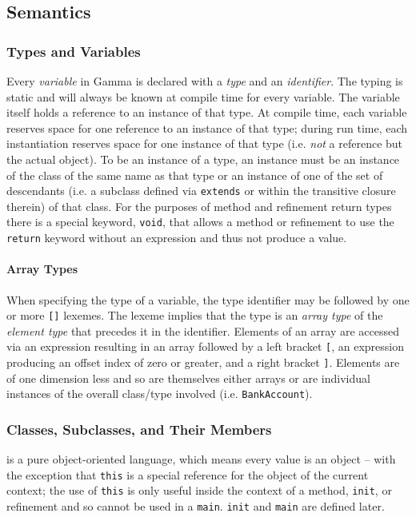 \subsection{Semantics}

\subsubsection{Types and Variables}
Every \textit{variable} in Gamma is declared with a \textit{type} and an \textit{identifier}. The typing is static and will always be known at compile time for every variable. The variable itself holds a reference to an instance of that type. At compile time, each variable reserves space for one reference to an instance of that type; during run time, each instantiation reserves space for one instance of that type (i.e. \emph{not} a reference but the actual object). To be an instance of a type, an instance must be an instance of the class of the same name as that type or an instance of one of the set of descendants (i.e. a subclass defined via \verb!extends! or within the transitive closure therein) of that class. For the purposes of method and refinement return types there is a special keyword, \verb!void!, that allows a method or refinement to use the \verb!return! keyword without an expression and thus not produce a value.

\paragraph{Array Types}
When specifying the type of a variable, the type identifier may be followed by one or more \verb![]! lexemes. The lexeme implies that the type is an \textit{array type} of the \textit{element type} that precedes it in the identifier. Elements of an array are accessed via an expression resulting in an array followed by a left bracket \verb![!, an expression producing an offset index of zero or greater, and a right bracket \verb!]!. Elements are of one dimension less and so are themselves either arrays or are individual instances of the overall class/type involved (i.e. \verb!BankAccount!).

\subsubsection{Classes, Subclasses, and Their Members}
\Lang{} is a pure object-oriented language, which means every value is an object -- with the exception that \verb!this! is a special reference for the object of the current context; the use of \verb!this! is only useful inside the context of a method, \verb!init!, or refinement and so cannot be used in a \verb!main!. \verb!init! and \verb!main! are defined later.

